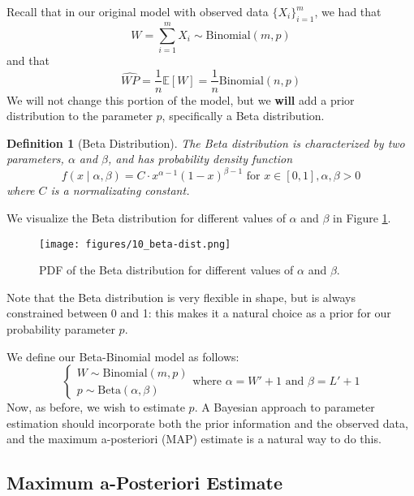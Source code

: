 \documentclass[twoside]{article}
\newtheorem{definition}[theorem]{Definition}
\theoremstyle{definition}
\begin{document}
Recall that in our original model with observed data $\{X_i\}_{i=1}^m$, we had that
\begin{equation}
    W = \sum_{i=1}^m X_i \sim \text{Binomial}(m, p)
\end{equation}
and that
\begin{equation}
    \widehat{WP} = \frac{1}{n} \mathbb{E}[W] = \frac{1}{n} \text{Binomial}(n, p)
\end{equation}
We will not change this portion of the model, but we \textbf{will} add a prior distribution to the parameter $p$, specifically a Beta distribution.
\begin{definition}[Beta Distribution]
    The Beta distribution is characterized by two parameters, $\alpha$ and $\beta$, and has probability density function
    \begin{equation}
        f(x \mid \alpha, \beta) = C \cdot x^{\alpha - 1} (1-x)^{\beta - 1} \text{ for } x \in [0, 1], \alpha, \beta > 0
    \end{equation}
    where $C$ is a normalizating constant.
\end{definition}
We visualize the Beta distribution for different values of $\alpha$ and $\beta$ in Figure \ref{fig:beta-dist}.
\begin{figure}[H]
    \centering
    \texttt{[image: figures/10\_beta-dist.png]}
    \caption{PDF of the Beta distribution for different values of $\alpha$ and $\beta$.}
    \label{fig:beta-dist}
\end{figure}
Note that the Beta distribution is very flexible in shape, but is always constrained between 0 and 1: this makes it a natural choice as a prior for our probability parameter $p$.

We define our Beta-Binomial model as follows:
\begin{equation}
    \begin{cases}
        W \sim \text{Binomial}(m, p) \\
        p \sim \text{Beta}(\alpha, \beta)
    \end{cases}
    \text{where } \alpha = W' + 1 \text{ and } \beta = L' + 1
\end{equation}
Now, as before, we wish to estimate $p$. A Bayesian approach to parameter estimation should incorporate both the prior information and the observed data, and the maximum a-posteriori (MAP) estimate is a natural way to do this.

\subsection{Maximum a-Posteriori Estimate}
\end{document}
